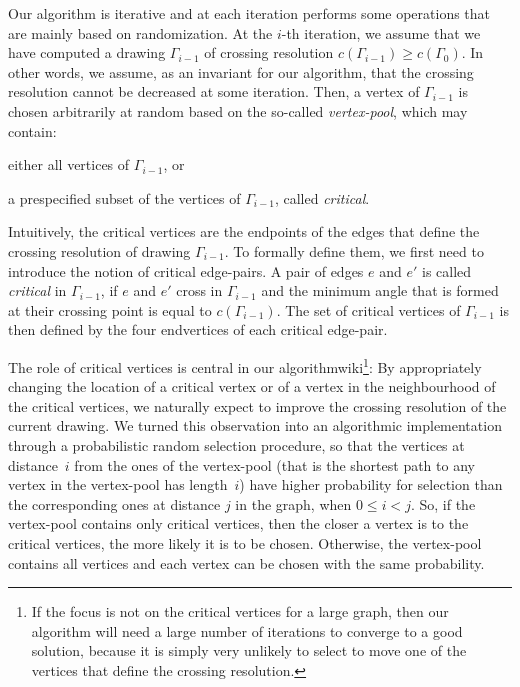 \documentclass[runningheads]{llncs}
\begin{document}
Our algorithm is iterative and at each iteration performs some operations that are mainly based on randomization. At the $i$-th iteration, we assume that we have computed a drawing $\Gamma_{i-1}$ of crossing resolution $c(\Gamma_{i-1}) \geq c(\Gamma_0)$.
In other words, we assume, as an invariant for our algorithm, that the crossing resolution cannot be decreased at some iteration. Then, a vertex of $\Gamma_{i-1}$ is chosen arbitrarily at random based on the so-called \emph{vertex-pool}, which may contain:
%
\begin{inparaenum}[(i)]
\item either all vertices of $\Gamma_{i-1}$, or
\item a prespecified subset of the vertices of $\Gamma_{i-1}$, called \emph{critical}.
\end{inparaenum}

Intuitively, the critical vertices are the endpoints of the edges that define the crossing resolution of drawing $\Gamma_{i-1}$. To formally define them, we first need to introduce the notion of critical edge-pairs. A pair of edges $e$ and $e'$ is called \emph{critical} in $\Gamma_{i-1}$, if $e$ and $e'$ cross in $\Gamma_{i-1}$ and the minimum angle that is formed at their crossing point is equal to $c(\Gamma_{i-1})$. The set of critical vertices of $\Gamma_{i-1}$ is then defined by the four endvertices of each critical edge-pair.

The role of critical vertices is central in our algorithmwiki\footnote{If the focus is not on the critical vertices for a large graph, then our algorithm will need a large number of iterations to converge to a good solution, because it is simply very unlikely to select to move one of the vertices that define the crossing resolution.}: By appropriately changing the location of a critical vertex or of a vertex in the neighbourhood of the critical vertices, we naturally expect to improve the crossing resolution of the current drawing. We turned this observation into an algorithmic implementation through a probabilistic random selection procedure, so that the vertices at distance~$i$ from the ones of the vertex-pool (that is the shortest path to any vertex in the vertex-pool has length~$i$)  have higher probability for selection than the corresponding ones at distance $j$  in the graph, when $0 \leq i<j$. So, if the vertex-pool contains only critical vertices, then the closer a vertex is to the critical vertices, the more likely it is to be chosen. Otherwise, the vertex-pool contains all vertices and each vertex can be chosen with the same probability.
\end{document}
